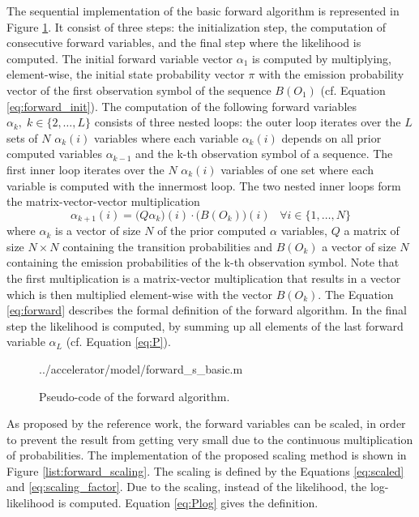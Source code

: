 \documentclass[mscthesis]{usiinfthesis}
\begin{document}
The sequential implementation of the basic forward algorithm is represented in
Figure \ref{list:forward_basic}. It consist of three steps: the initialization
step, the computation of consecutive forward variables, and the final step
where the likelihood is computed. The initial forward variable vector
$\alpha_1$ is computed by multiplying, element-wise, the initial state
probability vector $\pi$ with the emission probability vector of the first
observation symbol of the sequence $B(O_1)$ (cf. Equation
\ref{eq:forward_init}). The computation of the following forward variables
$\alpha_k, \; k \in \{2, \dots, L\}$ consists of three nested loops: the outer
loop iterates over the $L$ sets of $N$ $\alpha_k(i)$ variables where each
variable $\alpha_k(i)$ depends on all prior computed variables $\alpha_{k-1}$
and the k-th observation symbol of a sequence. The first inner loop iterates
over the $N$ $\alpha_k(i)$ variables of one set where each variable is computed
with the innermost loop. The two nested inner loops form the
matrix-vector-vector multiplication
\begin{equation}
    \label{eq:mvv}
    \alpha_{k+1}(i) = \big(Q \alpha_k\big)(i) \cdot \big(B(O_k)\big)(i) \;\;\;
        \forall i \in \{1, \dots, N\}
\end{equation}
where $\alpha_k$ is a vector of size $N$ of the prior computed $\alpha$
variables, $Q$ a matrix of size $N \times N$ containing the transition
probabilities and $B(O_k)$ a vector of size $N$ containing the emission
probabilities of the k-th observation symbol. Note that the first
multiplication is a matrix-vector multiplication that results in a vector which
is then multiplied element-wise with the vector $B(O_k)$. The Equation
\ref{eq:forward} describes the formal definition of the forward algorithm. In
the final step the likelihood is computed, by summing up all elements of the
last forward variable $\alpha_L$ (cf. Equation \ref{eq:P}).

\begin{figure}
    \centering
    
        {../accelerator/model/forward_s_basic.m}
    \caption{Pseudo-code of the forward algorithm.}
    \label{list:forward_basic}
\end{figure}

As proposed by the reference work, the forward variables can be scaled, in
order to prevent the result from getting very small due to the continuous
multiplication of probabilities. The implementation of the proposed scaling
method is shown in Figure \ref{list:forward_scaling}. The scaling is defined by
the Equations \ref{eq:scaled} and \ref{eq:scaling_factor}. Due to the scaling,
instead of the likelihood, the log-likelihood is computed. Equation
\ref{eq:Plog} gives the definition.
\end{document}
